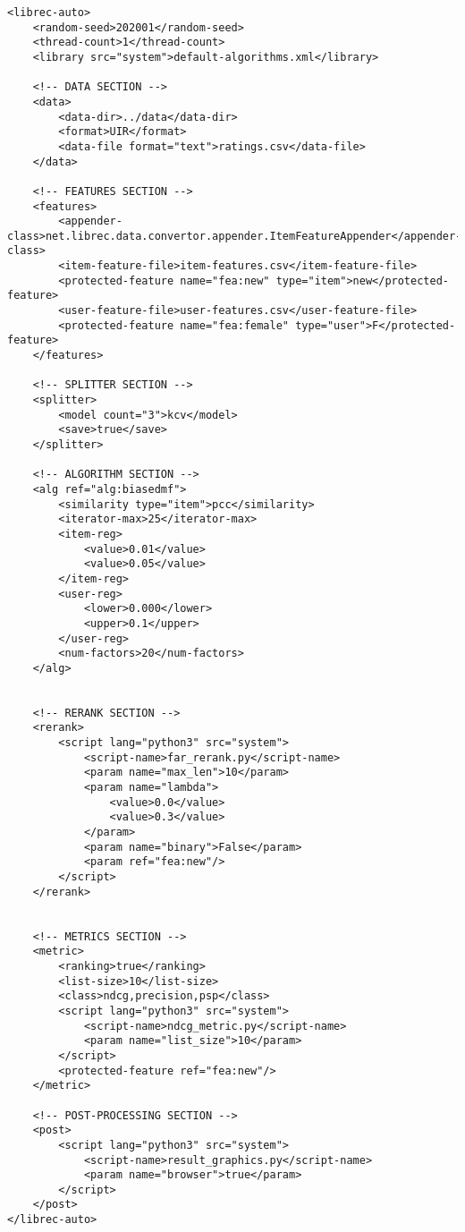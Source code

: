 \small{
\begin{verbatim}



<librec-auto>
    <random-seed>202001</random-seed>
    <thread-count>1</thread-count>
    <library src="system">default-algorithms.xml</library>
	
	<!-- DATA SECTION -->
	<data>
        <data-dir>../data</data-dir>
        <format>UIR</format>
        <data-file format="text">ratings.csv</data-file>
	</data>
	
	<!-- FEATURES SECTION -->
	<features>
		<appender-class>net.librec.data.convertor.appender.ItemFeatureAppender</appender-class>
		<item-feature-file>item-features.csv</item-feature-file>
		<protected-feature name="fea:new" type="item">new</protected-feature>
		<user-feature-file>user-features.csv</user-feature-file>
		<protected-feature name="fea:female" type="user">F</protected-feature>
	</features>
	
	<!-- SPLITTER SECTION -->
	<splitter>
        <model count="3">kcv</model>
        <save>true</save>
	</splitter>
	
	<!-- ALGORITHM SECTION -->
	<alg ref="alg:biasedmf">
        <similarity type="item">pcc</similarity>
        <iterator-max>25</iterator-max>
        <item-reg>
            <value>0.01</value>
            <value>0.05</value>
        </item-reg>
        <user-reg>
            <lower>0.000</lower>
            <upper>0.1</upper>
        </user-reg>
        <num-factors>20</num-factors>
	</alg>


    <!-- RERANK SECTION -->
	<rerank>
		<script lang="python3" src="system">
			<script-name>far_rerank.py</script-name>
			<param name="max_len">10</param>
			<param name="lambda">
			    <value>0.0</value>
			    <value>0.3</value>
			</param>
			<param name="binary">False</param>
			<param ref="fea:new"/>
		</script>
	</rerank>
    
    
    <!-- METRICS SECTION -->
	<metric>
        <ranking>true</ranking>
        <list-size>10</list-size>
        <class>ndcg,precision,psp</class>
        <script lang="python3" src="system">
            <script-name>ndcg_metric.py</script-name>
            <param name="list_size">10</param>
        </script>
        <protected-feature ref="fea:new"/>
	</metric>

    <!-- POST-PROCESSING SECTION -->	
	<post>
        <script lang="python3" src="system">
            <script-name>result_graphics.py</script-name>
            <param name="browser">true</param>
        </script> 
	</post>
</librec-auto>


\end{verbatim}
}
